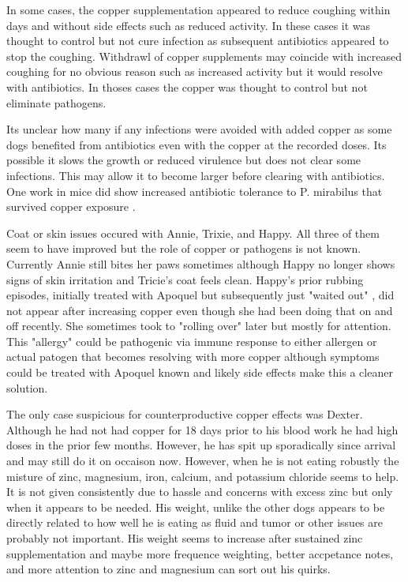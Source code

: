 In some cases, the copper supplementation appeared to reduce coughing within 
days and without side effects such as reduced activity. In
these cases it was thought to control but not cure
infection as subsequent antibiotics appeared to stop the coughing.
Withdrawl of copper supplements
may coincide with increased coughing for no obvious reason
such as increased activity but it would resolve
with antibiotics. In thoses cases the copper was thought
to control but not eliminate pathogens.

Its unclear how many if any infections were avoided with
added copper as some dogs benefited from antibiotics even with
the copper at the recorded doses. Its possible it slows the growth
or reduced virulence but does not clear some infections.
This may allow it to become larger before clearing with antibiotics.
One work in mice did show increased antibiotic tolerance to
P. mirabilus that survived copper exposure
\cite{Huang_Lee_Wang_Copper_affects_virulence_2024}.


Coat or skin issues occured with Annie, Trixie, and Happy.
All three of them seem to have improved but the role of
copper or pathogens is not known. Currently Annie still bites her paws sometimes
although Happy no longer shows signs of skin irritation and Tricie's
coat feels clean. 
Happy's prior rubbing episodes, initially treated with Apoquel but 
subsequently just "waited out" , did not appear
after increasing copper even though she had been doing that on and
off recently.
She sometimes took to "rolling over" later but mostly for attention. 
 This "allergy" could be  pathogenic via 
immune response to either allergen or actual patogen 
that becomes resolving with more copper although symptoms
could be treated with Apoquel known and likely side effects
make this a cleaner solution. 

The only case suspicious for counterproductive copper effects  was Dexter. 
Although he had not
had copper for 18 days prior to his blood work he had high
doses in the prior few months. However, he has spit up sporadically
since arrival and may still do it on occaison now. However,
when he is not eating robustly the misture of zinc, magnesium,
iron, calcium, and potassium chloride seems to help. It is not
given consistently due to hassle and concerns with excess zinc
but only when it appears to be needed.
His weight, unlike the other dogs appears to be directly related
to how well he is eating as fluid and tumor or other issues
are probably not important. His weight seems to increase after
sustained zinc supplementation and maybe more frequence weighting,
better accpetance notes, and more attention to zinc and magnesium
can sort out his quirks.

